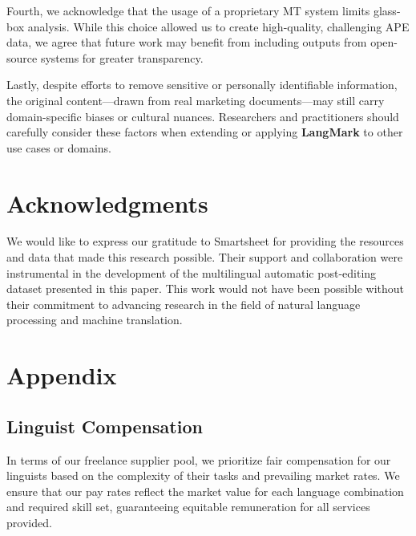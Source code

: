 \documentclass[11pt]{article}
\theoremstyle{plain}
\theoremstyle{definition}
\theoremstyle{remark}
\begin{document}
Fourth, we acknowledge that the usage of a proprietary MT system limits glass-box analysis. While this choice allowed us to create high-quality, challenging APE data, we agree that future work may benefit from including outputs from open-source systems for greater transparency.

Lastly, despite efforts to remove sensitive or personally identifiable information, the original content—drawn from real marketing documents—may still carry domain-specific biases or cultural nuances. Researchers and practitioners should carefully consider these factors when extending or applying \textbf{LangMark} to other use cases or domains.


\section*{Acknowledgments}
We would like to express our gratitude to Smartsheet for providing the resources and data that made this research possible. Their support and collaboration were instrumental in the development of the multilingual automatic post-editing dataset presented in this paper. This work would not have been possible without their commitment to advancing research in the field of natural language processing and machine translation.






\newpage
\appendix
\onecolumn
\section{Appendix}
\label{sec:appendix}

\subsection{Linguist Compensation}
\label{sec:comp}
In terms of our freelance supplier pool, we prioritize fair compensation for our linguists based on the complexity of their tasks and prevailing market rates. We ensure that our pay rates reflect the market value for each language combination and required skill set, guaranteeing equitable remuneration for all services provided.
 
\end{document}
